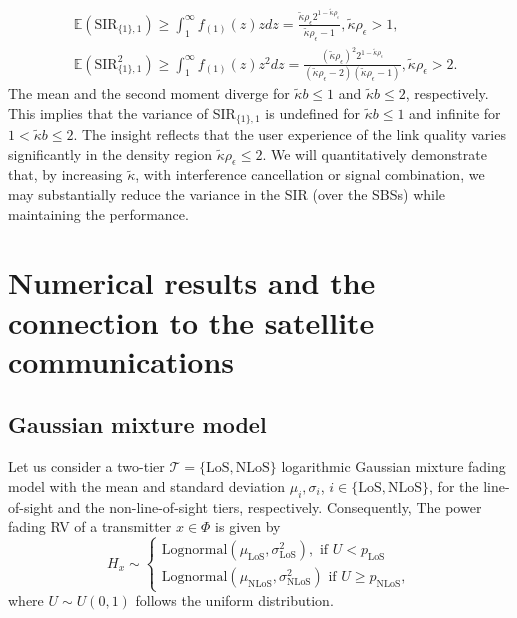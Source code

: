 \documentclass[lettersize,journal]{IEEEtran}
\begin{document}
\begin{align}
  &\mathbb{E}(\text{SIR}_{\{1\},1})  \geq\int_{1}^{\infty}f_{(1)}(z)zdz=\frac{\tilde{\kappa}\rho_{\epsilon}2^{1-\tilde{\kappa}\rho_{\epsilon} }}{\tilde{\kappa}\rho_{\epsilon}-1}, \tilde{\kappa}\rho_{\epsilon} >1, \\
  &\mathbb{E}(\text{SIR}^2_{\{1\},1}) \geq \int_{1}^{\infty}f_{(1)}(z)z^2dz = \frac{(\tilde{\kappa}\rho_{\epsilon}) ^2 2^{1-\tilde{\kappa}\rho_{\epsilon} }}{(\tilde{\kappa}\rho_{\epsilon} - 2)  (\tilde{\kappa}\rho_{\epsilon} - 1)}, \tilde{\kappa}\rho_{\epsilon}>2.
\end{align}
The mean and the second moment diverge for $\tilde{\kappa}b\leq 1$ and $\tilde{\kappa}b\leq 2$, respectively. This implies that the variance of SIR$_{\{1\},1}$ is undefined for $\tilde{\kappa}b \leq 1$ and infinite for $1 <\tilde{\kappa}b \leq 2$. The insight reflects that the user experience of the link quality varies significantly in the density region $\tilde{\kappa} \rho_{\epsilon} \leq 2$. We will quantitatively demonstrate that, by increasing $\tilde{\kappa}$, with interference cancellation or signal combination, we may substantially reduce the variance in the SIR (over the SBSs) while maintaining the performance.







\section{Numerical results and the connection to the satellite communications}


\subsection{Gaussian mixture model}
Let us consider a two-tier $\mathcal{T} = \{\text{LoS},\text{NLoS}\}$ logarithmic Gaussian mixture fading model with the mean and standard deviation $\mu_{i},\sigma_{i}$, $i \in \{\text{LoS},\text{NLoS} \}$, for the line-of-sight and the non-line-of-sight tiers, respectively. Consequently, The power fading RV of a transmitter $x \in \Phi$ is given by
\begin{equation}
  H_x \sim
  \begin{cases}
    \text{Lognormal}(\mu_{\text{LoS}},\sigma_{\text{LoS}}^2), \text{ if } U<p_{\text{LoS}} \\
    \text{Lognormal}(\mu_{\text{NLoS}},\sigma_{\text{NLoS}}^2)\text{ if } U \geq p_{\text{NLoS}},              \label{eq:tier2lognormal}
  \end{cases}
\end{equation}
where $U \sim U(0,1)$ follows the uniform distribution.
\end{document}
